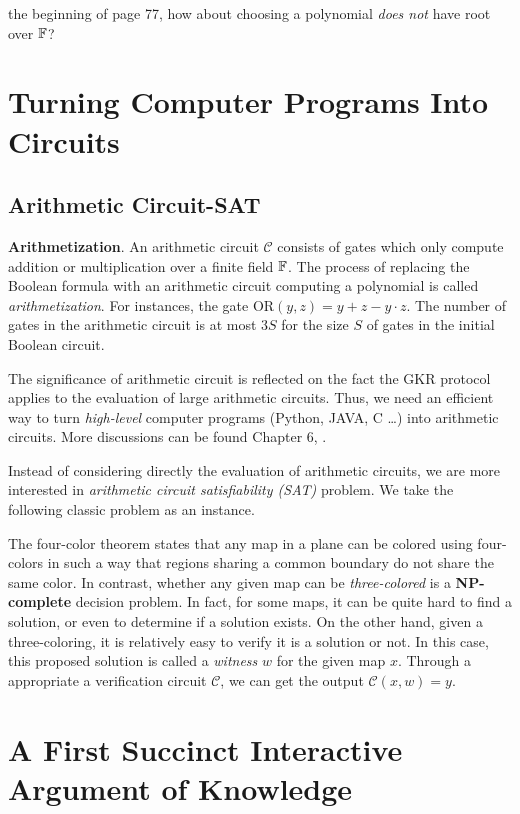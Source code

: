 \documentclass{article}
\begin{document}
\colorbox{BurntOrange}{\cite{ThalerBookZKP} the beginning of page 77, how about choosing a polynomial \textit{does not} have root over $\mathbb{F}$?}


\section{Turning Computer Programs Into Circuits}


\subsection{Arithmetic Circuit-SAT}

\textbf{Arithmetization}. An arithmetic circuit $\mathcal{C}$ consists of gates which only compute addition or multiplication over a finite field $\mathbb{F}$. The process of replacing the Boolean formula with an arithmetic circuit computing a polynomial is called \textit{arithmetization}. For instances, the gate $\text{OR}(y,z) = y + z - y \cdot z$. The number of gates in the arithmetic circuit is at most $3S$ for the size $S$ of gates in the initial Boolean circuit. 

The significance of arithmetic circuit is reflected on the fact the GKR protocol applies to the evaluation of large arithmetic circuits. Thus, we need an efficient way to turn \textit{high-level} computer programs (Python, JAVA, C \ldots) into arithmetic circuits. More discussions can be found Chapter 6, \cite{ThalerBookZKP}.

Instead of considering directly the evaluation of arithmetic circuits, we are more interested in \textit{arithmetic circuit satisfiability (SAT)} problem. We take the following classic problem as an instance.

The four-color theorem states that any map in a plane can be colored using four-colors in such a way that regions sharing a common boundary do not share the same color. In contrast, whether any given map can be \textit{three-colored} is a \textbf{NP-complete} decision problem. In fact, for some maps, it can be quite hard to find a solution, or even to determine if a solution exists. On the other hand, given a three-coloring, it is relatively easy to verify it is a solution or not. In this case, this proposed solution is called a \textit{witness} $w$ for the given map $x$. Through a appropriate a verification circuit $\mathcal{C}$, we can get the output $\mathcal{C}(x, w) = y$. 

\section{A First Succinct Interactive Argument of Knowledge}
 
\end{document}
